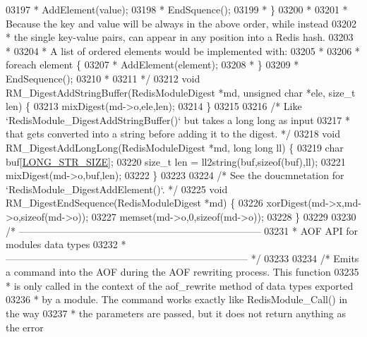 \begin{DoxyCode}
{{{{{03197 \textcolor{comment}{ *         AddElement(value);}
03198 \textcolor{comment}{ *         EndSquence();}
03199 \textcolor{comment}{ *     \}}
03200 \textcolor{comment}{ *}
03201 \textcolor{comment}{ * Because the key and value will be always in the above order, while instead}
03202 \textcolor{comment}{ * the single key-value pairs, can appear in any position into a Redis hash.}
03203 \textcolor{comment}{ *}
03204 \textcolor{comment}{ * A list of ordered elements would be implemented with:}
03205 \textcolor{comment}{ *}
03206 \textcolor{comment}{ *     foreach element \{}
03207 \textcolor{comment}{ *         AddElement(element);}
03208 \textcolor{comment}{ *     \}}
03209 \textcolor{comment}{ *     EndSequence();}
03210 \textcolor{comment}{ *}
03211 \textcolor{comment}{ */}
03212 \textcolor{keywordtype}{void} RM\_DigestAddStringBuffer(RedisModuleDigest *md, \textcolor{keywordtype}{unsigned} \textcolor{keywordtype}{char} *ele, size\_t len) \{
03213     mixDigest(md->o,ele,len);
03214 \}
03215 
03216 \textcolor{comment}{/* Like `RedisModule\_DigestAddStringBuffer()` but takes a long long as input}
03217 \textcolor{comment}{ * that gets converted into a string before adding it to the digest. */}
03218 \textcolor{keywordtype}{void} RM\_DigestAddLongLong(RedisModuleDigest *md, \textcolor{keywordtype}{long} \textcolor{keywordtype}{long} ll) \{
03219     \textcolor{keywordtype}{char} buf[\hyperlink{server_8h_a39ec35278876f65fc1ef70b049856ca3}{LONG\_STR\_SIZE}];
03220     size\_t len = ll2string(buf,\textcolor{keyword}{sizeof}(buf),ll);
03221     mixDigest(md->o,buf,len);
03222 \}
03223 
03224 \textcolor{comment}{/* See the doucmnetation for `RedisModule\_DigestAddElement()`. */}
03225 \textcolor{keywordtype}{void} RM\_DigestEndSequence(RedisModuleDigest *md) \{
03226     xorDigest(md->x,md->o,\textcolor{keyword}{sizeof}(md->o));
03227     memset(md->o,0,\textcolor{keyword}{sizeof}(md->o));
03228 \}
03229 
03230 \textcolor{comment}{/* --------------------------------------------------------------------------}
03231 \textcolor{comment}{ * AOF API for modules data types}
03232 \textcolor{comment}{ * -------------------------------------------------------------------------- */}
03233 
03234 \textcolor{comment}{/* Emits a command into the AOF during the AOF rewriting process. This function}
03235 \textcolor{comment}{ * is only called in the context of the aof\_rewrite method of data types exported}
03236 \textcolor{comment}{ * by a module. The command works exactly like RedisModule\_Call() in the way}
03237 \textcolor{comment}{ * the parameters are passed, but it does not return anything as the error}
}}}}}
\end{DoxyCode}
